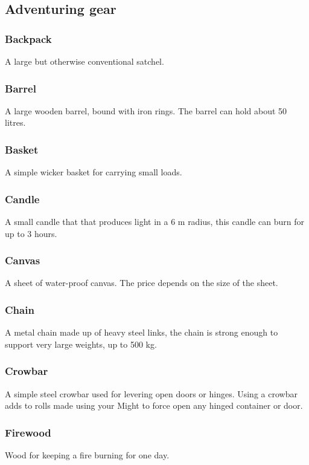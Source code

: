 \documentclass[a4paper,11pt,oneside]{book}
\newcommand{\textlf}[1]{\textbf{\titlecap{#1}}}
\begin{document}
\subsection{Adventuring gear}

\subsubsection*{Backpack}
A large but otherwise conventional satchel.

\subsubsection*{Barrel}
A large wooden barrel, bound with iron rings. The barrel can hold about 50 litres.

\subsubsection*{Basket}
A simple wicker basket for carrying small loads.

\subsubsection*{Candle}
A small candle that that produces \textlf{low} light in a 6 m radius, this candle can burn for up to 3 hours.

\subsubsection*{Canvas}
A sheet of water-proof canvas. The price depends on the size of the sheet.

\subsubsection*{Chain}
A metal chain made up of heavy steel links, the chain is strong enough to support very large weights, up to 500 kg.

\subsubsection*{Crowbar}
A simple steel crowbar used for levering open doors or hinges. Using a crowbar adds \textlf{edge+} to rolls made using your Might to force open any hinged container or door.

\subsubsection*{Firewood}
Wood for keeping a fire burning for one day.
\end{document}
